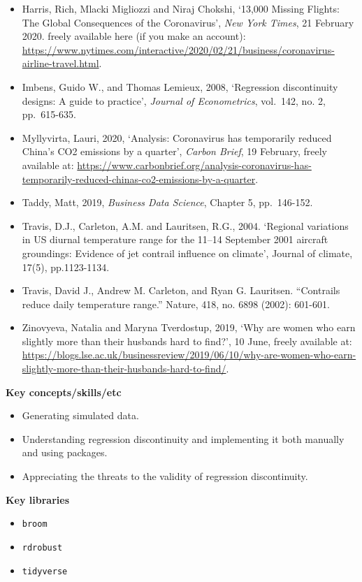 \documentclass[
]{book}
\providecommand{\tightlist}{%
  \setlength{\itemsep}{0pt}\setlength{\parskip}{0pt}}
\begin{document}
\begin{itemize}
\item
  Harris, Rich, Mlacki Migliozzi and Niraj Chokshi, `13,000 Missing Flights: The Global Consequences of the Coronavirus', \emph{New York Times}, 21 February 2020. freely available here (if you make an account): \url{https://www.nytimes.com/interactive/2020/02/21/business/coronavirus-airline-travel.html}.
\item
  Imbens, Guido W., and Thomas Lemieux, 2008, `Regression discontinuity designs: A guide to practice', \emph{Journal of Econometrics}, vol.~142, no. 2, pp.~615-635.
\item
  Myllyvirta, Lauri, 2020, `Analysis: Coronavirus has temporarily reduced China's CO2 emissions by a quarter', \emph{Carbon Brief}, 19 February, freely available at: \url{https://www.carbonbrief.org/analysis-coronavirus-has-temporarily-reduced-chinas-co2-emissions-by-a-quarter}.
\item
  Taddy, Matt, 2019, \emph{Business Data Science}, Chapter 5, pp.~146-152.
\item
  Travis, D.J., Carleton, A.M. and Lauritsen, R.G., 2004. `Regional variations in US diurnal temperature range for the 11--14 September 2001 aircraft groundings: Evidence of jet contrail influence on climate', Journal of climate, 17(5), pp.1123-1134.
\item
  Travis, David J., Andrew M. Carleton, and Ryan G. Lauritsen. ``Contrails reduce daily temperature range.'' Nature, 418, no. 6898 (2002): 601-601.
\item
  Zinovyeva, Natalia and Maryna Tverdostup, 2019, `Why are women who earn slightly more than their husbands hard to find?', 10 June, freely available at: \url{https://blogs.lse.ac.uk/businessreview/2019/06/10/why-are-women-who-earn-slightly-more-than-their-husbands-hard-to-find/}.
\end{itemize}

\textbf{Key concepts/skills/etc}

\begin{itemize}
\tightlist
\item
  Generating simulated data.
\item
  Understanding regression discontinuity and implementing it both manually and using packages.
\item
  Appreciating the threats to the validity of regression discontinuity.
\end{itemize}

\textbf{Key libraries}

\begin{itemize}
\tightlist
\item
  \texttt{broom}
\item
  \texttt{rdrobust}
\item
  \texttt{tidyverse}
\end{itemize}
\end{document}
